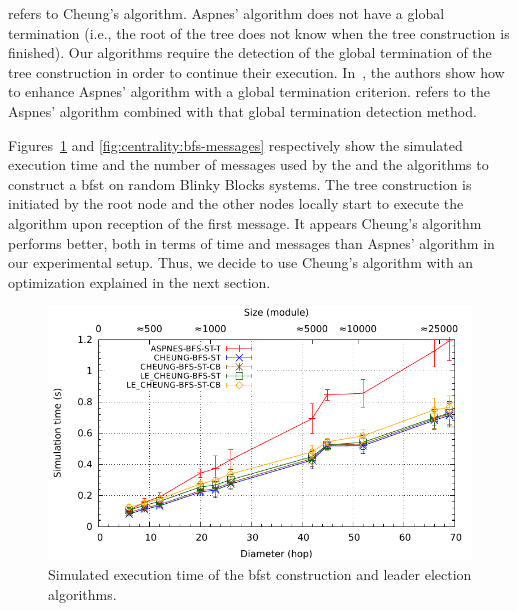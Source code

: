 \cheung{} refers to Cheung's algorithm. Aspnes' algorithm does not have a global termination (i.e., the root of the tree does not know when the tree construction is finished). Our algorithms require the detection of the global termination of the tree construction in order to continue their execution. In~\cite{boulinier2008space}, the authors show how to enhance Aspnes' algorithm with a global termination criterion. \aspnesT{} refers to the Aspnes' algorithm combined with that global termination detection method.

Figures~\ref{fig:centrality:bfs-time} and \ref{fig:centrality:bfs-messages} respectively show the simulated execution time and the number of messages used by the \cheung{} and the \aspnesT{} algorithms to construct a \gls{bfst} on random Blinky Blocks systems. The tree construction is initiated by the root node and the other nodes locally start to execute the algorithm upon reception of the first message. It appears Cheung's algorithm performs better, both in terms of time and messages than Aspnes' algorithm in our experimental setup. Thus, we decide to use  Cheung's algorithm with an optimization explained in the next section.

\begin{figure}[!h]
	\centering
	\includegraphics[width=\gnuplotGraphWidth]{images/centrality/ub/time}
	\caption{Simulated execution time of the \gls{bfst} construction and leader election algorithms.}
	\label{fig:centrality:bfs-time}
\end{figure}


